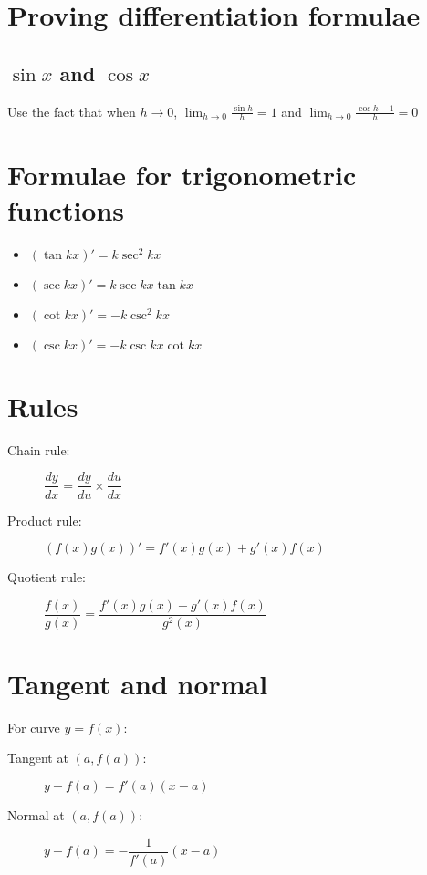 \section{Proving differentiation formulae}
\subsection{$\sin x$ and $\cos x$}
Use the fact that when $h\rightarrow0$, $\lim_{h\rightarrow0} \frac{\sin h}{h} = 1$ 
and $\lim_{h\rightarrow0} \frac{\cos h - 1}{h} = 0$

\section{Formulae for trigonometric functions}
\begin{itemize}
    \item $(\tan kx)' = k\sec^2 kx$
    \item $(\sec kx)' = k\sec kx \tan kx$
    \item $(\cot kx)' = -k\csc^2 kx$
    \item $(\csc kx)' = -k\csc kx \cot kx$
\end{itemize}

\section{Rules}
\begin{description}
    \item[Chain rule:] $\dfrac{dy}{dx} = \dfrac{dy}{du} \times \dfrac{du}{dx}$
    \item[Product rule:] $(f(x)g(x))'=f'(x)g(x)+g'(x)f(x)$
    \item[Quotient rule:] $\dfrac{f(x)}{g(x)} = \dfrac{f'(x)g(x)-g'(x)f(x)}{g^2(x)}$
\end{description}


\section{Tangent and normal}
For curve $y=f(x)$:
\begin{description}
    \item[Tangent at $(a,f(a))$:] $y-f(a)=f'(a)(x-a)$
    \item[Normal at $(a,f(a))$:] $y-f(a)=-\dfrac{1}{f'(a)}(x-a)$
\end{description}